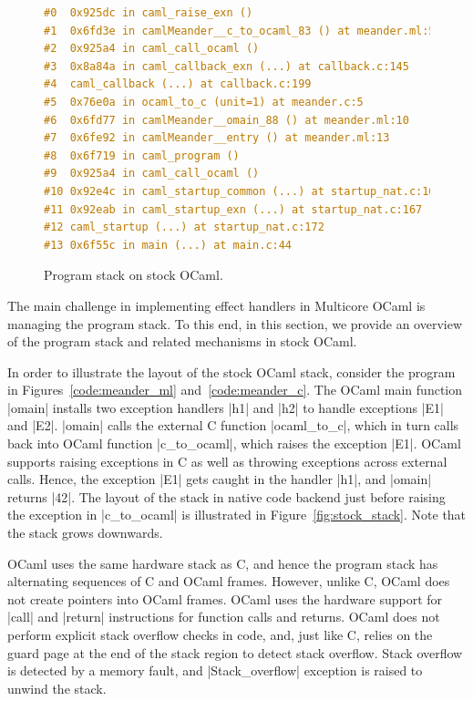 \documentclass[sigplan,10pt,review,anonymous]{acmart}\settopmatter{printfolios=true,printccs=false,printacmref=false}
\newcommand{\mycaption}[1]{\vspace{-4mm}\caption{#1}}
\begin{document}
\begin{figure}
\begin{minipage}{0.30\linewidth}
  \label{fig:stock_stack}
\end{minipage}
%
\begin{minipage}{0.39\linewidth}
\begin{lstlisting}[language=c,basicstyle=\ttfamily\footnotesize]
#0  0x925dc in caml_raise_exn ()
#1  0x6fd3e in camlMeander__c_to_ocaml_83 () at meander.ml:5
#2  0x925a4 in caml_call_ocaml ()
#3  0x8a84a in caml_callback_exn (...) at callback.c:145
#4  caml_callback (...) at callback.c:199
#5  0x76e0a in ocaml_to_c (unit=1) at meander.c:5
#6  0x6fd77 in camlMeander__omain_88 () at meander.ml:10
#7  0x6fe92 in camlMeander__entry () at meander.ml:13
#8  0x6f719 in caml_program ()
#9  0x925a4 in caml_call_ocaml ()
#10 0x92e4c in caml_startup_common (...) at startup_nat.c:162
#11 0x92eab in caml_startup_exn (...) at startup_nat.c:167
#12 caml_startup (...) at startup_nat.c:172
#13 0x6f55c in main (...) at main.c:44
\end{lstlisting}
\vspace{-2mm}
\label{code:gdb_backtrace}
\end{minipage}
  \mycaption{Program stack on stock OCaml.}
\end{figure}

The main challenge in implementing effect handlers in Multicore OCaml is
managing the program stack. To this end, in this section, we provide an
overview of the program stack and related mechanisms in stock OCaml.

In order to illustrate the layout of the stock OCaml stack, consider the
program in Figures~\ref{code:meander_ml} and~\ref{code:meander_c}. The OCaml
main function |omain| installs two exception handlers |h1| and |h2| to handle
exceptions |E1| and |E2|. |omain| calls the external C function |ocaml_to_c|,
which in turn calls back into OCaml function |c_to_ocaml|, which raises the
exception |E1|. OCaml supports raising exceptions in C as well as throwing
exceptions across external calls. Hence, the exception |E1| gets caught in the
handler |h1|, and |omain| returns |42|. The layout of the stack in native code
backend just before raising the exception in |c_to_ocaml| is illustrated in
Figure~\ref{fig:stock_stack}. Note that the stack grows downwards.

OCaml uses the same hardware stack as C, and hence the program stack has
alternating sequences of C and OCaml frames. However, unlike C, OCaml does not
create pointers into OCaml frames. OCaml uses the hardware support for |call|
and |return| instructions for function calls and returns. OCaml does not
perform explicit stack overflow checks in code, and, just like C, relies on the
guard page at the end of the stack region to detect stack overflow. Stack
overflow is detected by a memory fault, and |Stack_overflow| exception is
raised to unwind the stack.
\end{document}
